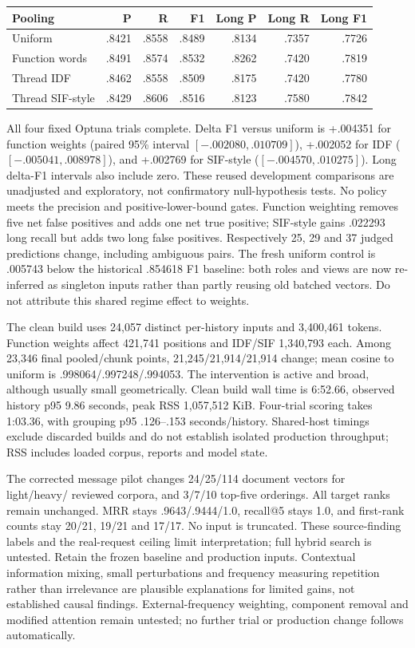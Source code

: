 \documentclass[11pt]{article}
\begin{document}
\begin{center}
\begin{tabular}{lrrrrrr}
\hline
Pooling & P & R & F1 & Long P & Long R & Long F1\\
\hline
Uniform & .8421 & .8558 & .8489 & .8134 & .7357 & .7726\\
Function words & .8491 & .8574 & .8532 & .8262 & .7420 & .7819\\
Thread IDF & .8462 & .8558 & .8509 & .8175 & .7420 & .7780\\
Thread SIF-style & .8429 & .8606 & .8516 & .8123 & .7580 & .7842\\
\hline
\end{tabular}
\end{center}
All four fixed Optuna trials complete. Delta F1 versus uniform is +.004351 for
function weights (paired 95\% interval $[-.002080,.010709]$), +.002052 for IDF
($[-.005041,.008978]$), and +.002769 for SIF-style
($[-.004570,.010275]$). Long delta-F1 intervals also include zero. These reused
development comparisons are unadjusted and exploratory, not confirmatory
null-hypothesis tests. No policy meets the precision and positive-lower-bound
gates. Function weighting removes five net false positives and adds one net true
positive; SIF-style gains .022293 long recall but adds two long false positives.
Respectively 25, 29 and 37 judged predictions change, including ambiguous pairs.
The fresh uniform control is .005743 below the historical .854618 F1 baseline:
both roles and views are now re-inferred as singleton inputs rather than partly
reusing old batched vectors. Do not attribute this shared regime effect to weights.

The clean build uses 24,057 distinct per-history inputs and 3,400,461 tokens.
Function weights affect 421,741 positions and IDF/SIF 1,340,793 each. Among 23,346
final pooled/chunk points, 21,245/21,914/21,914 change; mean cosine to uniform is
.998064/.997248/.994053. The intervention is active and broad, although usually
small geometrically. Clean build wall time is 6:52.66, observed history p95 9.86
seconds, peak RSS 1,057,512 KiB. Four-trial scoring takes 1:03.36, with grouping
p95 .126--.153 seconds/history. Shared-host timings exclude discarded builds and
do not establish isolated production throughput; RSS includes loaded corpus,
reports and model state.

The corrected message pilot changes 24/25/114 document vectors for light/heavy/
reviewed corpora, and 3/7/10 top-five orderings. All target ranks remain unchanged.
MRR stays .9643/.9444/1.0, recall@5 stays 1.0, and first-rank counts stay
20/21, 19/21 and 17/17. No input is truncated. These source-finding labels and
the real-request ceiling limit interpretation; full hybrid search is untested.
Retain the frozen baseline and production inputs. Contextual information mixing,
small perturbations and frequency measuring repetition rather than irrelevance
are plausible explanations for limited gains, not established causal findings.
External-frequency weighting, component removal and modified attention remain
untested; no further trial or production change follows automatically.
\end{document}
